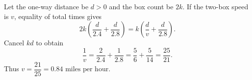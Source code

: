 Let the one-way distance be $d>0$ and the box count be $2k$. If the two-box speed is $v$, equality of total times gives
\[
2k\left(\dfrac{d}{2.4}+\dfrac{d}{2.8}\right)
=k\left(\dfrac{d}{v}+\dfrac{d}{2.8}\right).
\]
Cancel $kd$ to obtain
\[
\dfrac{1}{v}=\dfrac{2}{2.4}+\dfrac{1}{2.8}
=\dfrac{5}{6}+\dfrac{5}{14}=\dfrac{25}{21}.
\]
Thus $\boxed{v=\dfrac{21}{25}=0.84\text{ miles per hour}}$.
